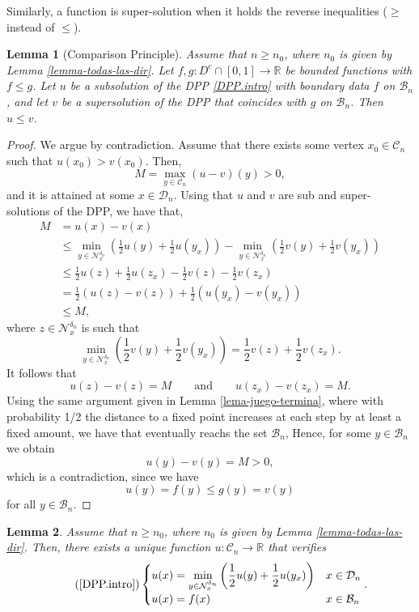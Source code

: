 \documentclass[11pt]{amsart}
\newtheorem{lemma}{Lemma}
\theoremstyle{definition}
\theoremstyle{remark}
\numberwithin{equation}{section}
\newcommand{\R}{{\mathbb R}}
\newcommand{\Domain}{\mathcal{D}}
\newcommand{\B}{\mathcal{B}}
\newcommand{\C}{{\mathcal C}}
\newcommand{\Nc}{{\mathcal N}}
\begin{document}
Similarly, a function is super-solution when it holds the reverse inequalities ($\geq$ instead of $\leq$). 


\begin{lemma}[Comparison Principle]
\label{lema-cp} 
Assume that $n\geq n_0$, where $n_0$ is given by Lemma \ref{lemma-todas-las-dir}.
Let $f, g \colon D^c \cap [0,1] \to \R$ be bounded functions with $f \leq g$.
Let $u$ be a subsolution of the DPP \eqref{DPP.intro} with boundary data $f$ on $\B_n$, and let $v$ be a supersolution of the DPP that coincides with $g$ on $\B_n$.
Then $u \leq v$.
\end{lemma}

\begin{proof}
We argue by contradiction. 
Assume that there exists some vertex $x_0\in\C_n$ such that $u(x_0)>v(x_0)$. 
Then,
\begin{equation}
M
=
\max_{y\in \C_n}
(u-v)(y)>0,
\end{equation}
and it is attained at some $x\in \Domain_n$.
Using that $u$ and $v$ are sub and super-solutions of the DPP, we have that,
\begin{align*}
M &
= u(x)-v(x) \\
&\displaystyle  \leq 
\min_{y\in \Nc_x^{\delta_n}} 
\left(
\frac{1}{2} 
u(y) 
+
\frac{1}{2}
u(y_x) 
\right)
-
\min_{y\in \Nc_x^{\delta_n}} 
\left(
\frac{1}{2} 
v(y) 
+
\frac{1}{2}
v(y_x) 
\right)
\\
& \displaystyle 
\leq 
\frac{1}{2} 
u(z) 
+
\frac{1}{2}
u(z_x) 
-
\frac{1}{2} 
v(z) 
-
\frac{1}{2}
v(z_x)
\\
&\displaystyle  =
\frac{1}{2} 
\left(
u(z) 
-
v(z) 
\right)
+
\frac{1}{2}
\left(
u(y_x) 
-
v(y_x)
\right)
\\
& \displaystyle  \leq M
,
\end{align*}
where $z\in \Nc_x^{\delta_n}$ is such that
\[
\min_{y\in \Nc_x^{\delta_n}} 
\left(
\frac{1}{2} 
v(y) 
+
\frac{1}{2}
v(y_x) 
\right)
=
\frac{1}{2} 
v(z) 
+
\frac{1}{2}
v(z_x)
.
\]
It follows that 
\[
u(z) 
-
v(z) 
= M
\qquad 
\text{and}
\qquad
u(z_x) 
-
v(z_x)
=
M
.
\]
Using the same argument given in Lemma \ref{lema-juego-termina}, where with probability 1/2 the distance to a fixed point increases at each step by at least a fixed amount, we have that eventually reachs the set $\B_n$,
Hence, for some $y\in \B_n$ we obtain
\[
u(y)-v(y) 
= 
M
>
0,
\]
which is a contradiction, since we have $$u(y)=f(y)\leq g(y)= v(y)$$
for all $y\in\B_n$.
\end{proof}


\begin{lemma} 
Assume that $n \geq n_0$, where $n_0$ is given by Lemma \ref{lemma-todas-las-dir}.
Then, there exists a unique function $u \colon \C_n\rightarrow \R$ that verifies 
\begin{equation}
\tag{\ref{DPP.intro}}
\label{DPP.sec}
\begin{cases}
\displaystyle  u(x)=\min\limits_{y\in \Nc_x^{\delta_n}} 
\left(
\frac{1}{2} 
u(y) 
+
\frac{1}{2}
u(y_x) 
\right)
& x\in \Domain_n \\
u(x)=f(x)
& x\in \B_n
\end{cases} 
.
\end{equation}
\end{lemma}
\end{document}
